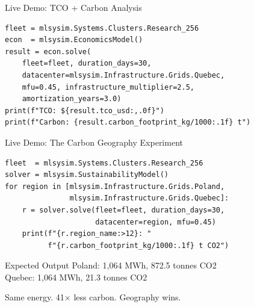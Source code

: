 \documentclass[aspectratio=169, 12pt]{beamer}
\begin{document}
\begin{frame}[fragile]{Live Demo: TCO + Carbon Analysis}
\begin{lstlisting}
fleet = mlsysim.Systems.Clusters.Research_256
econ  = mlsysim.EconomicsModel()
result = econ.solve(
    fleet=fleet, duration_days=30,
    datacenter=mlsysim.Infrastructure.Grids.Quebec,
    mfu=0.45, infrastructure_multiplier=2.5,
    amortization_years=3.0)
print(f"TCO: ${result.tco_usd:,.0f}")
print(f"Carbon: {result.carbon_footprint_kg/1000:.1f} t")
\end{lstlisting}
\end{frame}

\begin{frame}[fragile]{Live Demo: The Carbon Geography Experiment}
\begin{lstlisting}
fleet  = mlsysim.Systems.Clusters.Research_256
solver = mlsysim.SustainabilityModel()
for region in [mlsysim.Infrastructure.Grids.Poland,
               mlsysim.Infrastructure.Grids.Quebec]:
    r = solver.solve(fleet=fleet, duration_days=30,
                     datacenter=region, mfu=0.45)
    print(f"{r.region_name:>12}: "
          f"{r.carbon_footprint_kg/1000:.1f} t CO2")
\end{lstlisting}

\vspace{0.5em}
\begin{exampleblock}{Expected Output}
\ttfamily\scriptsize
\hspace{1em}Poland: 1,064 MWh, 872.5 tonnes CO2\\
\hspace{1em}Quebec: 1,064 MWh, \phantom{0}21.3 tonnes CO2
\end{exampleblock}

\vspace{0.3em}
\alert{Same energy. 41$\times$ less carbon. Geography wins.}
\end{frame}
\end{document}
